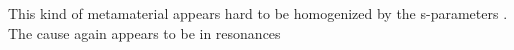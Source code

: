 This kind of metamaterial appears hard to be homogenized by the s-parameters \cite{wang2010composite}. The cause again appears to be in resonances 






